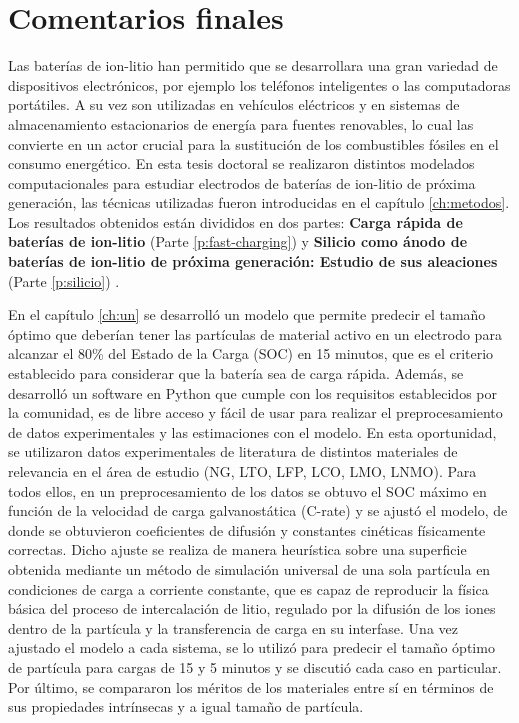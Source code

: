 \chapter{Comentarios finales}\label{ch:comentarios}

Las baterías de ion-litio han permitido que se desarrollara una gran variedad de
dispositivos electrónicos, por ejemplo los teléfonos inteligentes o las 
computadoras portátiles. A su vez son utilizadas en vehículos eléctricos y en 
sistemas de almacenamiento estacionarios de energía para fuentes
renovables, lo cual las convierte en un actor crucial para la sustitución de 
los combustibles fósiles en el consumo energético. En esta tesis doctoral se 
realizaron distintos modelados computacionales para estudiar electrodos de 
baterías de ion-litio de próxima generación, las técnicas utilizadas fueron 
introducidas en el capítulo \ref{ch:metodos}. Los resultados obtenidos están 
divididos en dos partes: \textbf{Carga rápida de baterías de ion-litio} (Parte 
\ref{p:fast-charging}) \cite{fernandez2023towards} y \textbf{Silicio como ánodo
de baterías de ion-litio de próxima generación: Estudio de sus aleaciones} (Parte 
\ref{p:silicio}) \cite{fernandez2023nmr, oviedo2023, fernandez2021characterization}.

En el capítulo \ref{ch:un} se desarrolló un modelo que permite predecir el tamaño
óptimo que deberían tener las partículas de material activo en un electrodo para 
alcanzar el 80\% del Estado de la Carga (SOC) en 15 minutos, que es el criterio
establecido para considerar que la batería sea de carga rápida. Además, se 
desarrolló un software en Python que cumple con los requisitos establecidos por 
la comunidad, es de libre acceso y fácil de usar para realizar el preprocesamiento
de datos experimentales y las estimaciones con el modelo. En esta oportunidad, se 
utilizaron datos experimentales de literatura de distintos materiales de 
relevancia en el área de estudio (NG, LTO, LFP, LCO, LMO, LNMO). Para todos ellos,
en un preprocesamiento de los datos se obtuvo el SOC máximo en función de la 
velocidad de carga galvanostática (C-rate) y se ajustó el modelo, de donde 
se obtuvieron coeficientes de difusión y constantes cinéticas físicamente 
correctas. Dicho ajuste se realiza de manera heurística sobre una superficie 
obtenida mediante un método de simulación universal de una sola partícula en 
condiciones de carga a corriente constante, que es capaz de reproducir la física 
básica del proceso de intercalación de litio, regulado por la difusión de los 
iones dentro de la partícula y la transferencia de carga en su interfase.
Una vez ajustado el modelo a cada sistema, se lo utilizó para predecir el tamaño
óptimo de partícula para cargas de 15 y 5 minutos y se discutió cada caso en 
particular. Por último, se compararon los méritos de los materiales entre sí en 
términos de sus propiedades intrínsecas y a igual tamaño de partícula.

